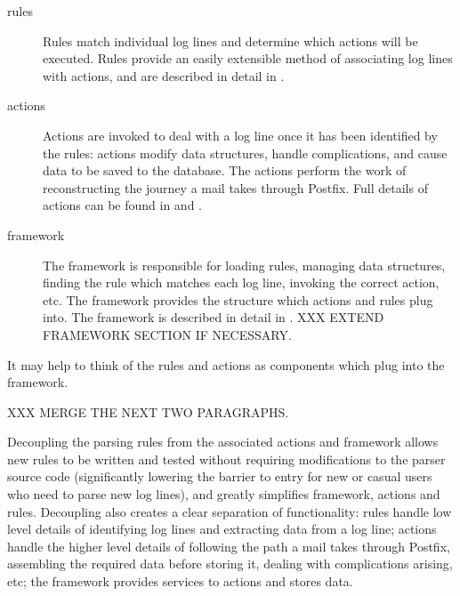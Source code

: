 \begin{description}

    \item [rules] Rules match individual log lines and determine which
        actions will be executed.  Rules provide an easily extensible
        method of associating log lines with actions, and are described in
        detail in .

    \item [actions] Actions are invoked to deal with a log line once it has
        been identified by the rules: actions modify data structures,
        handle complications, and cause data to be saved to the database.
        The actions perform the work of reconstructing the journey a mail
        takes through Postfix.  Full details of actions can be found in
         and .

    \item [framework] The framework is responsible for loading rules,
        managing data structures, finding the rule which matches each log
        line, invoking the correct action, etc.  The framework provides the
        structure which actions and rules plug into.  The framework is
        described in detail in .  XXX EXTEND
        FRAMEWORK SECTION IF NECESSARY\@.

\end{description}

It may help to think of the rules and actions as components which plug into
the framework.  

\label{why separate rules, actions and framework?}

XXX MERGE THE NEXT TWO PARAGRAPHS\@.

Decoupling the parsing rules from the associated actions and framework
allows new rules to be written and tested without requiring modifications
to the parser source code (significantly lowering the barrier to entry for
new or casual users who need to parse new log lines), and greatly
simplifies framework, actions and rules.  Decoupling also creates a clear
separation of functionality: rules handle low level details of identifying
log lines and extracting data from a log line; actions handle
the higher level details of following the path a mail takes through
Postfix, assembling the required data before storing it, dealing with
complications arising, etc; the framework provides services to actions and
stores data.

